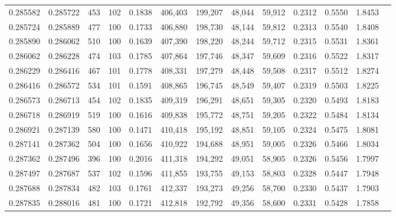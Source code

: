 \begin{tabular}{rrrrrrrrrrrrr}
0.285582 & 0.285722 &   453 & 102 &                                     0.1838 & 406,403 & 199,207 &  48,044 &  59,912 & 0.2312 & 0.5550 & 1.8453 \\
0.285724 & 0.285889 &   477 & 100 &                                     0.1733 & 406,880 & 198,730 &  48,144 &  59,812 & 0.2313 & 0.5540 & 1.8408 \\
0.285890 & 0.286062 &   510 & 100 &                                     0.1639 & 407,390 & 198,220 &  48,244 &  59,712 & 0.2315 & 0.5531 & 1.8361 \\
0.286062 & 0.286228 &   474 & 103 &                                     0.1785 & 407,864 & 197,746 &  48,347 &  59,609 & 0.2316 & 0.5522 & 1.8317 \\
0.286229 & 0.286416 &   467 & 101 &                                     0.1778 & 408,331 & 197,279 &  48,448 &  59,508 & 0.2317 & 0.5512 & 1.8274 \\
0.286416 & 0.286572 &   534 & 101 &                                     0.1591 & 408,865 & 196,745 &  48,549 &  59,407 & 0.2319 & 0.5503 & 1.8225 \\
0.286573 & 0.286713 &   454 & 102 &                                     0.1835 & 409,319 & 196,291 &  48,651 &  59,305 & 0.2320 & 0.5493 & 1.8183 \\
0.286718 & 0.286919 &   519 & 100 &                                     0.1616 & 409,838 & 195,772 &  48,751 &  59,205 & 0.2322 & 0.5484 & 1.8134 \\
0.286921 & 0.287139 &   580 & 100 &                                     0.1471 & 410,418 & 195,192 &  48,851 &  59,105 & 0.2324 & 0.5475 & 1.8081 \\
0.287141 & 0.287362 &   504 & 100 &                                     0.1656 & 410,922 & 194,688 &  48,951 &  59,005 & 0.2326 & 0.5466 & 1.8034 \\
0.287362 & 0.287496 &   396 & 100 &                                     0.2016 & 411,318 & 194,292 &  49,051 &  58,905 & 0.2326 & 0.5456 & 1.7997 \\
0.287497 & 0.287687 &   537 & 102 &                                     0.1596 & 411,855 & 193,755 &  49,153 &  58,803 & 0.2328 & 0.5447 & 1.7948 \\
0.287688 & 0.287834 &   482 & 103 &                                     0.1761 & 412,337 & 193,273 &  49,256 &  58,700 & 0.2330 & 0.5437 & 1.7903 \\
0.287835 & 0.288016 &   481 & 100 &                                     0.1721 & 412,818 & 192,792 &  49,356 &  58,600 & 0.2331 & 0.5428 & 1.7858 \\

\end{tabular}
